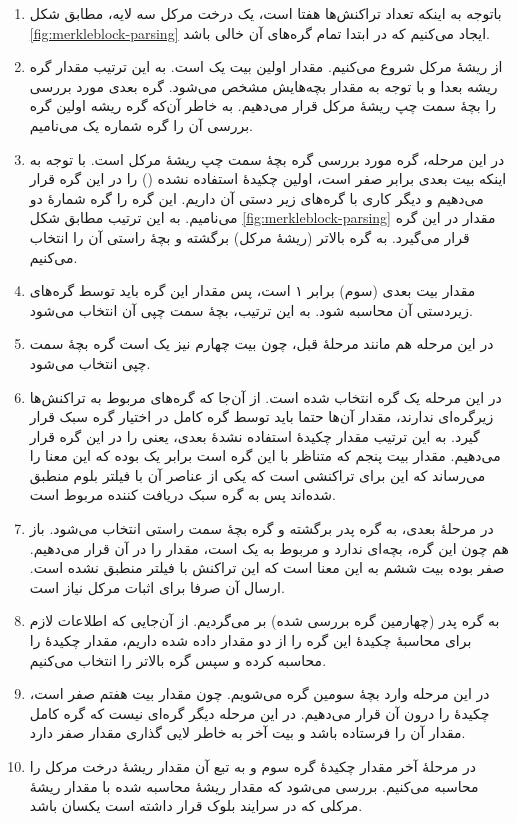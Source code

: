 \begin{enumerate}
		\item {%
		باتوجه به اینکه تعداد تراکنش‌ها هفتا است، یک درخت مرکل سه لایه، مطابق شکل \ref{fig:merkleblock-parsing} ایجاد می‌کنیم که در ابتدا تمام گره‌های آن خالی باشد.
	}
	\item {%
		از ریشهٔ مرکل شروع می‌کنیم. مقدار اولین بیت  یک است. به این ترتیب مقدار گره ریشه بعدا و با توجه به مقدار بچه‌هایش مشخص می‌شود. گره بعدی مورد بررسی را بچهٔ سمت چپ ریشهٔ مرکل قرار می‌دهیم. به خاطر آن‌که گره ریشه اولین گره بررسی آن را گره شماره یک می‌نامیم.
	}

	\item {%
در این مرحله، گره مورد بررسی گره بچهٔ سمت چپ ریشهٔ مرکل است. با توجه به اینکه بیت بعدی  برابر صفر است، اولین چکیدهٔ استفاده نشده () را در این گره قرار می‌دهیم و دیگر کاری با گره‌های زیر دستی آن داریم. این گره را گره شمارهٔ دو می‌نامیم. به این ترتیب مطابق شکل \ref{fig:merkleblock-parsing} مقدار  در این گره قرار می‌گیرد. به گره بالاتر (ریشهٔ مرکل) برگشته و بچهٔ راستی آن را انتخاب می‌کنیم.
	}
	\item{%
	مقدار بیت بعدی (سوم)  برابر ۱ است، پس  مقدار این گره باید توسط گره‌های زیردستی آن محاسبه شود. به این ترتیب، بچهٔ سمت چپی آن انتخاب می‌شود.
}
	\item{%
	در این مرحله‌ هم مانند مرحلهٔ قبل، چون بیت چهارم  نیز یک است گره بچهٔ سمت چپی انتخاب می‌شود.
}
	\item{%
	در این مرحله یک گره  انتخاب شده است. از آن‌جا که گره‌های مربوط به تراکنش‌ها زیرگره‌ای ندارند، مقدار آن‌ها حتما باید توسط گره کامل در اختیار گره سبک قرار گیرد. به این ترتیب مقدار چکیدهٔ استفاده نشدهٔ بعدی، یعنی  را در این گره قرار می‌دهیم. مقدار بیت پنجم  که متناظر با این گره است برابر یک بوده که این معنا را می‌رساند که این  برای تراکنشی است که یکی از عناصر آن با فیلتر بلوم منطبق شده‌اند پس به گره سبک دریافت کننده مربوط است. 
}

	\item{%
	در مرحلهٔ بعدی، به گره پدر برگشته و گره بچهٔ سمت راستی انتخاب می‌شود. باز هم چون این گره، بچه‌ای ندارد و مربوط به یک  است، مقدار   را در آن قرار می‌دهیم. صفر بوده بیت ششم  به این معنا است که این تراکنش با فیلتر منطبق نشده است. ارسال آن صرفا برای اثبات مرکل نیاز است.
}

	\item{%
	به گره پدر (چهارمین گره بررسی شده) بر می‌گردیم. از آن‌جایی که اطلاعات لازم برای محاسبهٔ چکیدهٔ این گره را از دو مقدار   داده شده داریم، مقدار چکیدهٔ را محاسبه کرده و سپس گره بالاتر را انتخاب می‌کنیم. 
}
	\item{%
	در این مرحله وارد بچهٔ سومین گره می‌شویم. چون مقدار بیت هفتم  صفر است، چکیدهٔ  را درون آن قرار می‌دهیم. در این مرحله دیگر گره‌ای نیست که گره کامل مقدار آن را فرستاده باشد و بیت آخر  به خاطر لایی گذاری مقدار صفر دارد. 
}
	\item{%
	در مرحلهٔ آخر مقدار چکیدهٔ گره سوم و به تبع آن مقدار ریشهٔ درخت مرکل را محاسبه می‌کنیم. بررسی می‌شود که مقدار ریشهٔ محاسبه شده با مقدار ریشهٔ مرکلی که در سرایند بلوک قرار داشته است یکسان باشد.
}
\end{enumerate}

